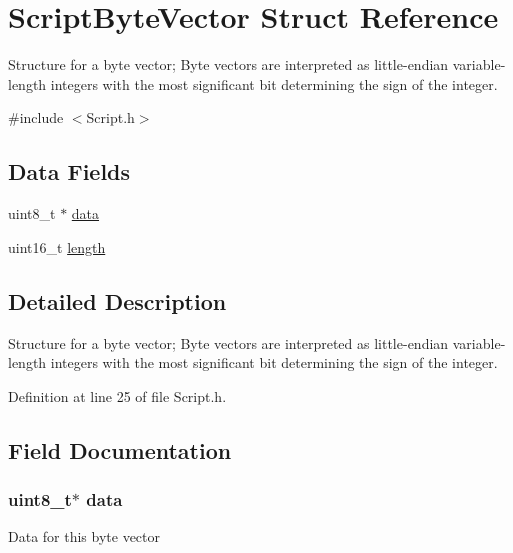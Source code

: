 \hypertarget{struct_m_i_script_byte_vector}{
\section{ScriptByteVector Struct Reference}
\label{struct_m_i_script_byte_vector}
}


Structure for a byte vector; Byte vectors are interpreted as little-\/endian variable-\/length integers with the most significant bit determining the sign of the integer.  




{\ttfamily \#include $<$Script.h$>$}

\subsection*{Data Fields}
\begin{DoxyCompactItemize}
\item 
uint8\_\-t $\ast$ \hyperlink{struct_m_i_script_byte_vector_abe222f6d3581e7920dcad5306cc906a8}{data}
\item 
uint16\_\-t \hyperlink{struct_m_i_script_byte_vector_a1892eba2086d12ac2b09005aeb09ea3b}{length}
\end{DoxyCompactItemize}


\subsection{Detailed Description}
Structure for a byte vector; Byte vectors are interpreted as little-\/endian variable-\/length integers with the most significant bit determining the sign of the integer. 

Definition at line 25 of file Script.h.



\subsection{Field Documentation}
\hypertarget{struct_m_i_script_byte_vector_abe222f6d3581e7920dcad5306cc906a8}{
\subsubsection[{data}]{\setlength{\rightskip}{0pt plus 5cm}uint8\_\-t$\ast$ {\bf data}}}
\label{struct_m_i_script_byte_vector_abe222f6d3581e7920dcad5306cc906a8}
Data for this byte vector 

